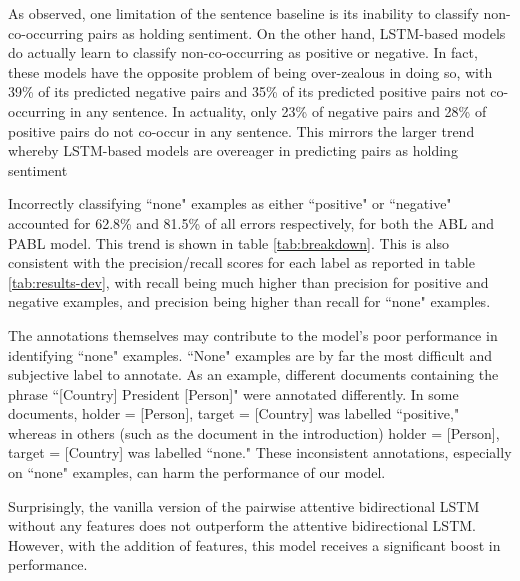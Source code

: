 \documentclass[11pt,a4paper]{article}
\begin{document}
As observed, one limitation of the sentence baseline is its inability to classify non-co-occurring pairs as holding sentiment.
On the other hand, LSTM-based models do actually learn to classify non-co-occurring as positive or negative.
In fact, these models have the opposite problem of being over-zealous in doing so, with 39\% of its predicted negative pairs and 35\% of its predicted positive pairs not co-occurring in any sentence.
In actuality, only 23\% of negative pairs and 28\% of positive pairs do not co-occur in any sentence.
This mirrors the larger trend whereby LSTM-based models are overeager in predicting pairs as holding sentiment 
\par Incorrectly classifying ``none" examples as either ``positive" or ``negative" accounted for 62.8\% and 81.5\% of all errors respectively, for both the ABL and PABL model.
This trend is shown in table \ref{tab:breakdown}.
This is also consistent with the precision/recall scores for each label as reported in table \ref{tab:results-dev}, with recall being much higher than precision for positive and negative examples, and precision being higher than recall for ``none" examples.
\par The annotations themselves may contribute to the model's poor performance in identifying ``none" examples.
``None" examples are by far the most difficult and subjective label to annotate.
As an example, different documents containing the phrase ``[Country] President [Person]" were annotated differently.
In some documents, holder = [Person], target = [Country] was labelled ``positive," whereas in others (such as the document in the introduction) holder = [Person], target = [Country] was labelled ``none."
These inconsistent annotations, especially on ``none" examples, can harm the performance of our model.
\par Surprisingly, the vanilla version of the pairwise attentive bidirectional LSTM without any features does not outperform the attentive bidirectional LSTM.
However, with the addition of features, this model receives a significant boost in performance.
\end{document}
